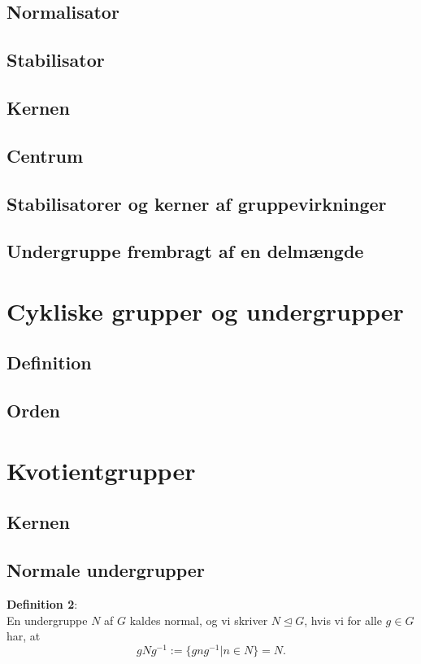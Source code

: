 \documentclass[11pt]{article}
\begin{document}
\subsection*{Normalisator}


\subsection*{Stabilisator}


\subsection*{Kernen}


\subsection*{Centrum}


\subsection*{Stabilisatorer og kerner af gruppevirkninger}


\subsection*{Undergruppe frembragt af en delmængde}


\section*{Cykliske grupper og undergrupper}
\subsection*{Definition}


\subsection*{Orden}

\section*{Kvotientgrupper}
\subsection*{Kernen}

\subsection*{Normale undergrupper}
\textbf{Definition 2}:\\
En undergruppe $N$ af $G$ kaldes normal, og vi skriver $N \trianglelefteq G$, hvis vi for alle $g \in G$ har, at\\
$$gNg^{-1} := \{ gng^{-1} | n \in N \} = N.$$
\end{document}
